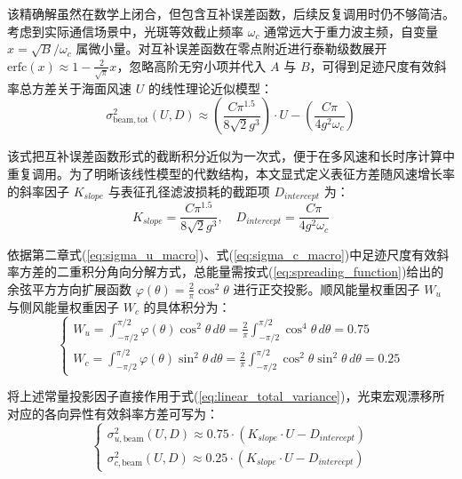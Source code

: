 该精确解虽然在数学上闭合，但包含互补误差函数，后续反复调用时仍不够简洁。考虑到实际通信场景中，光斑等效截止频率 $\omega_c$ 通常远大于重力波主频，自变量 $x = \sqrt{B}/\omega_c$ 属微小量。对互补误差函数在零点附近进行泰勒级数展开 $\mathrm{erfc}(x) \approx 1 - \frac{2}{\sqrt{\pi}}x$，忽略高阶无穷小项并代入 $A$ 与 $B$，可得到足迹尺度有效斜率总方差关于海面风速 $U$ 的线性理论近似模型：
\begin{equation}
	\sigma_{\mathrm{beam},\mathrm{tot}}^2(U, D) \approx \left( \frac{C \pi^{1.5}}{8 \sqrt{2} g^3} \right) \cdot U - \left( \frac{C \pi}{4 g^2 \omega_c} \right)
	\label{eq:linear_total_variance}
\end{equation}

该式把互补误差函数形式的截断积分近似为一次式，便于在多风速和长时序计算中重复调用。为了明晰该线性模型的代数结构，本文显式定义表征方差随风速增长率的斜率因子 $K_{slope}$ 与表征孔径滤波损耗的截距项 $D_{intercept}$ 为：
\begin{equation}
	K_{slope} = \frac{C \pi^{1.5}}{8 \sqrt{2} g^3}, \quad D_{intercept} = \frac{C \pi}{4 g^2 \omega_c}
	\label{eq:kslope_dintercept}
\end{equation}

依据第二章式(\ref{eq:sigma_u_macro})、式(\ref{eq:sigma_c_macro})中足迹尺度有效斜率方差的二重积分角向分解方式，总能量需按式(\ref{eq:spreading_function})给出的余弦平方方向扩展函数 $\varphi(\theta) = \frac{2}{\pi}\cos^2\theta$ 进行正交投影。顺风能量权重因子 $W_u$ 与侧风能量权重因子 $W_c$ 的具体积分为：
\begin{equation}
	\begin{cases}
		W_u = \int_{-\pi/2}^{\pi/2} \varphi(\theta) \cos^2\theta \, d\theta = \frac{2}{\pi} \int_{-\pi/2}^{\pi/2} \cos^4\theta \, d\theta = 0.75 \\
		W_c = \int_{-\pi/2}^{\pi/2} \varphi(\theta) \sin^2\theta \, d\theta = \frac{2}{\pi} \int_{-\pi/2}^{\pi/2} \cos^2\theta \sin^2\theta \, d\theta = 0.25
	\end{cases}
	\label{eq:weights_integration}
\end{equation}

将上述常量投影因子直接作用于式(\ref{eq:linear_total_variance})，光束宏观漂移所对应的各向异性有效斜率方差可写为：
\begin{equation}
	\begin{cases}
		\sigma_{u,\mathrm{beam}}^2(U,D) \approx 0.75 \cdot (K_{slope} \cdot U - D_{intercept}) \\
		\sigma_{c,\mathrm{beam}}^2(U,D) \approx 0.25 \cdot (K_{slope} \cdot U - D_{intercept})
	\end{cases}
	\label{eq:final_variance_split}
\end{equation}

